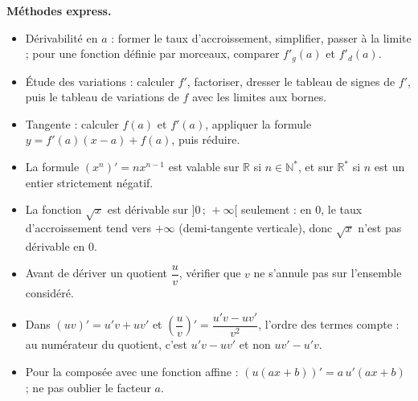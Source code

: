 \documentclass[11pt]{article}
\begin{document}
\begin{aretenir}
\textbf{Méthodes express.}
\begin{itemize}
  \item Dérivabilité en $a$ : former le taux d'accroissement, simplifier, passer à la limite ; pour une fonction définie par morceaux, comparer $f'_g(a)$ et $f'_d(a)$.
  \item Étude des variations : calculer $f'$, factoriser, dresser le tableau de signes de $f'$, puis le tableau de variations de $f$ avec les limites aux bornes.
  \item Tangente : calculer $f(a)$ et $f'(a)$, appliquer la formule $y=f'(a)(x-a)+f(a)$, puis réduire.
\end{itemize}
\end{aretenir}

\begin{attention}
\begin{itemize}
  \item La formule $(x^n)'=nx^{n-1}$ est valable sur $\mathbb{R}$ si $n\in\mathbb{N}^*$, et sur $\mathbb{R}^*$ si $n$ est un entier strictement négatif.
  \item La fonction $\sqrt{x}$ est dérivable sur $]0\,;\,+\infty[$ seulement : en $0$, le taux d'accroissement tend vers $+\infty$ (demi-tangente verticale), donc $\sqrt{x}$ n'est pas dérivable en $0$.
  \item Avant de dériver un quotient $\dfrac{u}{v}$, vérifier que $v$ ne s'annule pas sur l'ensemble considéré.
  \item Dans $(uv)'=u'v+uv'$ et $\left(\dfrac{u}{v}\right)'=\dfrac{u'v-uv'}{v^2}$, l'ordre des termes compte : au numérateur du quotient, c'est $u'v-uv'$ et non $uv'-u'v$.
  \item Pour la composée avec une fonction affine : $(u(ax+b))'=a\,u'(ax+b)$ ; ne pas oublier le facteur $a$.
\end{itemize}
\end{attention}
\end{document}
